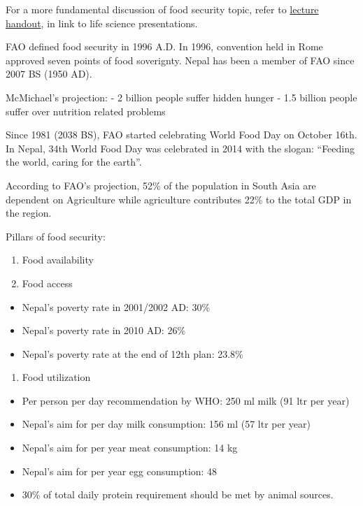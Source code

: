 \documentclass[
]{book}
\providecommand{\tightlist}{%
  \setlength{\itemsep}{0pt}\setlength{\parskip}{0pt}}
\begin{document}
For a more fundamental discussion of food security topic, refer to \href{https://github.com/DeependraD/life_science_presentations/raw/master/food_security.pdf}{lecture handout}, in link to life science presentations.

FAO defined food security in 1996 A.D. In 1996, convention held in Rome approved seven points of food soverignty. Nepal has been a member of FAO since 2007 BS (1950 AD).

McMichael's projection:
- 2 billion people suffer hidden hunger
- 1.5 billion people suffer over nutrition related problems

Since 1981 (2038 BS), FAO started celebrating World Food Day on October 16th. In Nepal, 34th World Food Day was celebrated in 2014 with the slogan: ``Feeding the world, caring for the earth''.

According to FAO's projection, 52\% of the population in South Asia are dependent on Agriculture while agriculture contributes 22\% to the total GDP in the region.

Pillars of food security:

\begin{enumerate}
\def\labelenumi{\arabic{enumi}.}
\tightlist
\item
  Food availability
\item
  Food access
\end{enumerate}

\begin{itemize}
\tightlist
\item
  Nepal's poverty rate in 2001/2002 AD: 30\%
\item
  Nepal's poverty rate in 2010 AD: 26\%
\item
  Nepal's poverty rate at the end of 12th plan: 23.8\%
\end{itemize}

\begin{enumerate}
\def\labelenumi{\arabic{enumi}.}
\setcounter{enumi}{2}
\tightlist
\item
  Food utilization
\end{enumerate}

\begin{itemize}
\tightlist
\item
  Per person per day recommendation by WHO: 250 ml milk (91 ltr per year)
\item
  Nepal's aim for per day milk consumption: 156 ml (57 ltr per year)
\item
  Nepal's aim for per year meat consumption: 14 kg
\item
  Nepal's aim for per year egg consumption: 48
\item
  30\% of total daily protein requirement should be met by animal sources.
\end{itemize}
\end{document}
